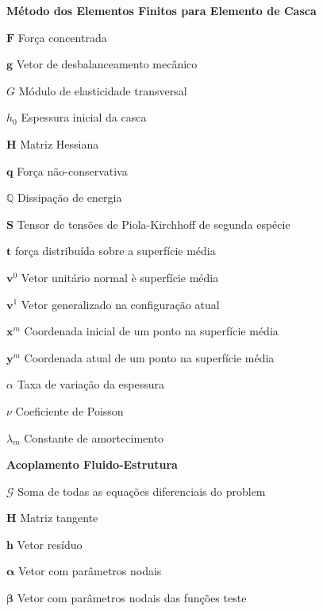\documentclass[12pt,
	openright,	%
	twoside,    %
	a4paper,			%
	sumario=tradicional,
	english,			%
	french, 			%
	brazil				%
]{USPSC}
\newcommand{\script}[1]{\mathcal{#1}}
\newcommand{\BB}[1]{\mathbf{#1}}
\begin{document}
\begin{simbolos}
    \item[\textbf{Método dos Elementos Finitos para Elemento de Casca}]
    \item[$\BB{F}$] Força concentrada
    \item[$\BB{g}$] Vetor de desbalanceamento mecânico
    \item[$G$] Módulo de elasticidade transversal
    \item[$h_0$] Espessura inicial da casca
    \item[$\BB{H}$] Matriz Hessiana
    \item[$\BB{q}$] Força não-conservativa
    \item[$\mathbb{Q}$] Dissipação de energia
    \item[$\BB{S}$] Tensor de tensões de Piola-Kirchhoff de segunda espécie
    \item[$\BB{t}$] força distribuída sobre a superfície média
    \item[$\BB{v}^0$] Vetor unitário normal è superfície média
    \item[$\BB{v}^1$] Vetor generalizado na configuração atual
    \item[$\BB{x}^m$] Coordenada inicial de um ponto na superfície média
    \item[$\BB{y}^m$] Coordenada atual de um ponto na superfície média
    \item[$\alpha$] Taxa de variação da espessura
    \item[$\nu$] Coeficiente de Poisson
    \item[$\lambda_m$] Constante de amortecimento

    \item[\textbf{Acoplamento Fluido-Estrutura}]
    \item[$\script{G}$] Soma de todas as equações diferenciais do problem
    \item[$\BB{H}$] Matriz tangente
    \item[$\BB{h}$] Vetor resíduo
    \item[$\BB{\alpha}$] Vetor com parâmetros nodais
    \item[$\BB{\beta}$] Vetor com parâmetros nodais das funções teste


\end{simbolos}
\end{document}
